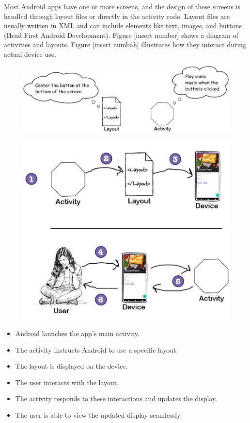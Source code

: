 Most Android apps have one or more screens, and the design of these screens is handled through layout files or directly in the activity code. Layout files are usually written in XML and can include elements like text, images, and buttons (Head First Android Development). Figure [insert number] shows a diagram of activities and layouts. Figure [insert numbah] illustrates how they interact during actual device use.
\begin{figure}[H]
	\centering
	\includegraphics[width=0.7\linewidth]{activity_layout.png}
	\caption{}
	\label{fig:activitylayout}
\end{figure}
\begin{figure}[H]
	\centering
	\includegraphics[width=0.7\linewidth]{activity_layout_process}
	\caption{}
	\label{fig:activitylayoutprocess}
\end{figure}

\begin{itemize} 
	\item Android launches the app’s main activity.
	\item The activity instructs Android to use a specific layout.
	\item The layout is displayed on the device.
	\item The user interacts with the layout.
	\item The activity responds to these interactions and updates the display.
	\item The user is able to view the updated display seamlessly.
\end{itemize}

